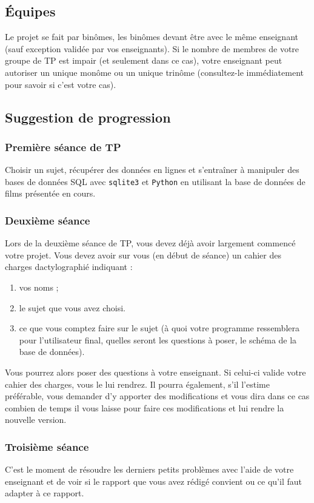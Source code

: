 \subsection{Équipes}
Le projet  se fait par binômes,  les binômes devant être avec le même
enseignant (sauf exception validée par vos enseignants).  Si  le nombre  de membres  de votre  groupe de  TP est
impair (et seulement dans ce  cas), votre enseignant peut autoriser un
unique monôme  ou un  unique trinôme (consultez-le  immédiatement pour
savoir si c'est votre cas).

\subsection{Suggestion de progression}

\subsubsection{Première séance de TP} Choisir un sujet, récupérer des données en lignes et s'entraîner à
manipuler des bases de données SQL avec \texttt{sqlite3} et \texttt{Python}
en utilisant la base de données de films présentée en cours.

\subsubsection{Deuxième séance} 
Lors de  la deuxième  séance de  TP, vous  devez déjà  avoir largement
commencé  votre projet.   Vous devez  avoir  sur vous (en début de séance) un cahier  des
charges dactylographié indiquant :
\begin{enumerate}
\item vos noms ;
\item le sujet que vous avez choisi.
\item ce que vous comptez faire sur le sujet (à quoi votre programme  ressemblera pour l'utilisateur final, quelles seront les questions à poser, le schéma de la base de données).
\end{enumerate}
Vous pourrez alors poser des questions à votre enseignant. Si celui-ci
valide  votre  cahier  des  charges,   vous le lui  rendrez.  Il  pourra
également, s'il  l'estime préférable,  vous demander d'y  apporter des
modifications et vous dira dans ce cas combien de temps il vous laisse
pour faire ces modifications et lui rendre la nouvelle version.

\subsubsection{Troisième séance}
C'est le moment de résoudre les derniers petits problèmes avec l'aide
de votre enseignant et de voir si le rapport que vous avez rédigé
convient ou ce qu'il faut adapter à ce rapport.

